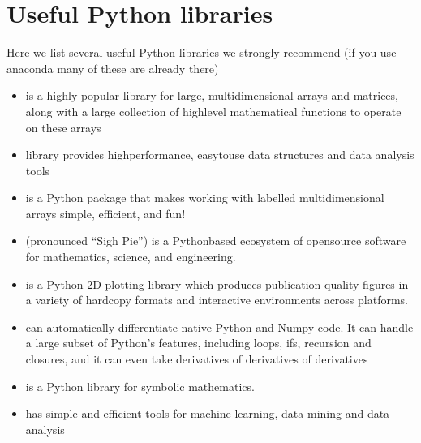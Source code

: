 \documentclass[letterpaper,10pt,english]{sphinxmanual}
\begin{document}
\section{Useful Python libraries}
\label{\detokenize{chapter1:useful-python-libraries}}
Here we list several useful Python libraries we strongly recommend (if you use anaconda many of these are already there)
\begin{itemize}
\item {} 
 is a highly popular library for large, multi\sphinxhyphen{}dimensional arrays and matrices, along with a large collection of high\sphinxhyphen{}level mathematical functions to operate on these arrays

\item {} 
 library provides high\sphinxhyphen{}performance, easy\sphinxhyphen{}to\sphinxhyphen{}use data structures and data analysis tools

\item {} 
 is a Python package that makes working with labelled multi\sphinxhyphen{}dimensional arrays simple, efficient, and fun!

\item {} 
 (pronounced “Sigh Pie”) is a Python\sphinxhyphen{}based ecosystem of open\sphinxhyphen{}source software for mathematics, science, and engineering.

\item {} 
 is a Python 2D plotting library which produces publication quality figures in a variety of hardcopy formats and interactive environments across platforms.

\item {} 
 can automatically differentiate native Python and Numpy code. It can handle a large subset of Python’s features, including loops, ifs, recursion and closures, and it can even take derivatives of derivatives of derivatives

\item {} 
 is a Python library for symbolic mathematics.

\item {} 
 has simple and efficient tools for machine learning, data mining and data analysis


\end{itemize}
\end{document}
